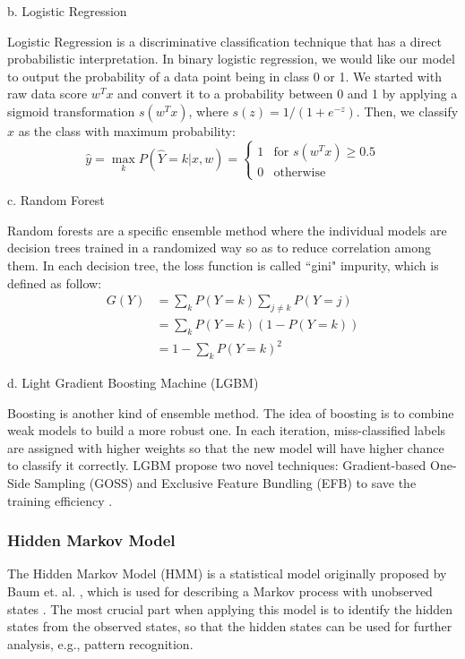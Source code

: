 \documentclass[conference]{IEEEtran}
\begin{document}
b.	Logistic Regression 

Logistic Regression is a discriminative classification technique that has a direct probabilistic interpretation. In binary logistic regression, we would like our model to output the probability of a data point being in class 0 or 1. We started with raw data score $w^Tx$ and convert it to a probability between 0 and 1 by applying a sigmoid transformation $s(w^Tx)$, where $s(z) = 1/(1+e^{-z})$. Then, we classify $x$ as the class with maximum probability: 
\begin{equation}
\hat{y}=\max_kP(\hat{Y}=k|x,w)=\left\{
\begin{array}{cl}
1&\text{for }s(w^Tx)\geq 0.5\\
0&\text{otherwise}
\end{array}
\right.
\end{equation}

c. Random Forest

Random forests are a specific ensemble method where the individual models are decision trees trained in a randomized way so as to reduce correlation among them. In each decision tree, the loss function is called ``gini" impurity, which is defined as follow:
\begin{equation}
\begin{array}{rl}
G(Y)&=\sum_kP(Y=k)\sum_{j\neq k}P(Y=j)\\
&=\sum_kP(Y=k)(1-P(Y=k))\\
&=1-\sum_kP(Y=k)^2
\end{array}
\end{equation}

d. Light Gradient Boosting Machine (LGBM)

Boosting is another kind of ensemble method. The idea of boosting is to combine weak models to build a more robust one. In each iteration, miss-classified labels are assigned with higher weights so that the new model will have higher chance to classify it correctly. LGBM propose two novel techniques: Gradient-based One-Side Sampling (GOSS) and Exclusive Feature Bundling (EFB) to save the training efficiency \cite{QIS2}.

\subsubsection{Hidden Markov Model}
The Hidden Markov Model (HMM) is a statistical model originally proposed by Baum et. al. \cite{hmm1}, which is used for describing a Markov process with unobserved states \cite{hmm2}. The most crucial part when applying this model is to identify the hidden states from the observed states, so that the hidden states can be used for further analysis, e.g., pattern recognition. 
\end{document}
